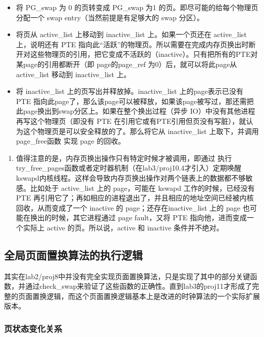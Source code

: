 \begin{itemize}
\tightlist
\item
  将 PG\_swap 为 0 的页转变成 PG\_swap 为1
  的页。即尽可能的给每个物理页分配一个 swap entry（当然前提是有足够大的
  swap 分区）。
\item
  将页从 active\_list 上移动到 inactive\_list 上。如果一个页还在
  active\_list 上，说明还有 PTE
  指向此``活跃''的物理页。所以需要在完成内存页换出时断开对这些物理页的引用，把它变成不活跃的（inactive）。只有把所有的PTE对某page的引用都断开（即
  page的page\_ref 为0）后，就可以将此page从 active\_list 移动到
  inactive\_list 上。
\item
  将 inactive\_list 上的页写出并释放掉。inactive\_list
  上的page表示已没有 PTE
  指向此page了，那么该page可以被释放，如果该page被写过，那还需把此page换出到swap分区上。如果在整个换出过程（异步
  IO）中没有其他进程再写这个物理页（即没有 PTE
  在引用它或有PTE引用但页没有写脏），就认为这个物理页是可以安全释放的了。那么将它从
  inactive\_list 上取下，并调用 page\_free函数 实现 page 的回收。
\end{itemize}

\begin{enumerate}
\def\labelenumi{\arabic{enumi}.}
\setcounter{enumi}{3}
\tightlist
\item
  值得注意的是，内存页换出操作只有特定时候才被调用，即通过
  执行try\_free\_pages函数或者定时器机制（在lab3/proj10.4才引入）定期唤醒kswapd内核线程。这样会导致内存页换出操作对两个链表上的数据都不够敏感。比如处于
  active\_list 上的 page，可能在 kswapd 工作的时候，已经没有 PTE
  再引用它了；再如相应的进程退出了，并且相应的地址空间已经被内核回收，从而变成了一个
  inactive 的 page；还存在inactive\_list 上的 page
  也可能在换出的时候，其它进程通过 page fault，又将 PTE
  指向他，进而变成一个实际上 active 的页。所以说，active 和 inactive
  条件并不绝对。
\end{enumerate}

\subsection{全局页面置换算法的执行逻辑}\label{ux5168ux5c40ux9875ux9762ux7f6eux6362ux7b97ux6cd5ux7684ux6267ux884cux903bux8f91}

其实在lab2/proj8中并没有完全实现页面置换算法，只是实现了其中的部分关键函数，并通过check\_swap来验证了这些函数的正确性。直到lab3的proj11才形成了完整的页面置换逻辑，而这个页面置换逻辑基本上是改进的时钟算法的一个实际扩展版本。

\subsubsection{页状态变化关系}\label{ux9875ux72b6ux6001ux53d8ux5316ux5173ux7cfb}

